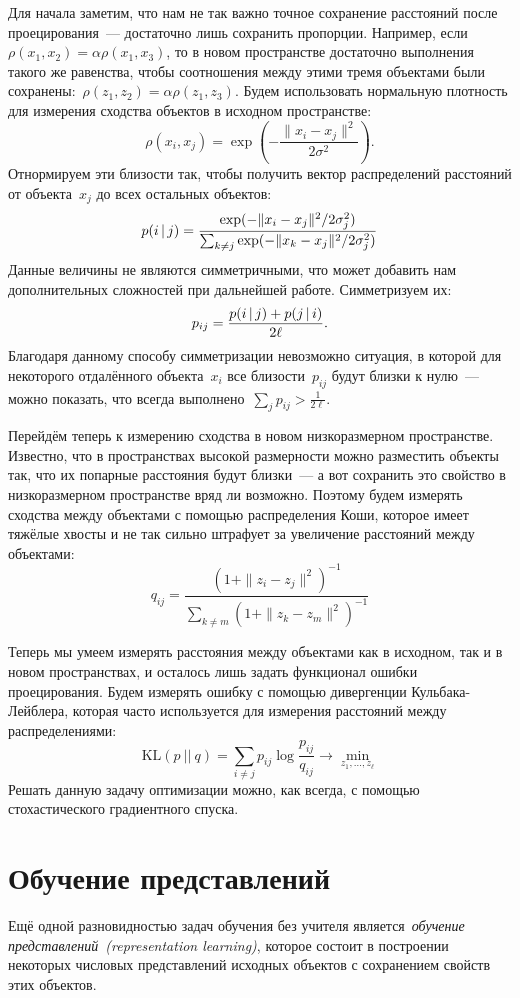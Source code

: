 \documentclass[12pt,fleqn]{article}
\begin{document}
Для начала заметим, что нам не так важно точное сохранение расстояний после проецирования~---
достаточно лишь сохранить пропорции.
Например, если~$\rho(x_1, x_2) = \alpha \rho(x_1, x_3)$,
то в новом пространстве достаточно выполнения такого же равенства,
чтобы соотношения между этими тремя объектами были сохранены:~$\rho(z_1, z_2) = \alpha \rho(z_1, z_3)$.
Будем использовать нормальную плотность для измерения сходства объектов в исходном пространстве:
\[
    \rho(x_i, x_j)
    =
    \exp\left(
        -\frac{
            \|x_i - x_j\|^2
        }{
            2 \sigma^2
        }
    \right).
\]
Отнормируем эти близости так, чтобы получить вектор распределений расстояний от объекта~$x_j$ до всех
остальных объектов:
\[
    p(i \mspace{3mu}{|}\mspace{3mu} j)
    =
    \frac{
        \exp(-\|x_i - x_j\|^2 / 2 \sigma_j^2)
    }{
        \sum_{k \neq j} \exp(-\|x_k - x_j\|^2 / 2 \sigma_j^2)
    }
\]
Данные величины не являются симметричными, что может добавить нам дополнительных сложностей
при дальнейшей работе.
Симметризуем их:
\[
    p_{ij}
    =
    \frac{p(i \mspace{3mu}{|}\mspace{3mu} j) + p(j \mspace{3mu}{|}\mspace{3mu} i)}{2\ell}.
\]
Благодаря данному способу симметризации невозможно ситуация, в которой для некоторого
отдалённого объекта~$x_i$ все близости~$p_{ij}$ будут близки к нулю~---
можно показать, что всегда выполнено~$\sum_j p_{ij} > \frac{1}{2\ell}$.

Перейдём теперь к измерению сходства в новом низкоразмерном пространстве.
Известно, что в пространствах высокой размерности можно разместить объекты так,
что их попарные расстояния будут близки~--- а вот сохранить это свойство в низкоразмерном
пространстве вряд ли возможно.
Поэтому будем измерять сходства между объектами с помощью распределения Коши, которое
имеет тяжёлые хвосты и не так сильно штрафует за увеличение расстояний между объектами:
\[
    q_{ij}
    =
    \frac{
        (1 + \|z_i - z_j\|^2)^{-1}
    }{
        \sum_{k \neq m} (1 + \|z_k - z_m\|^2)^{-1}
    }
\]

Теперь мы умеем измерять расстояния между объектами как в исходном, так и в новом пространствах,
и осталось лишь задать функционал ошибки проецирования.
Будем измерять ошибку с помощью дивергенции Кульбака-Лейблера,
которая часто используется для измерения расстояний между распределениями:
\[
    \text{KL}(p\ ||\ q)
    =
    \sum_{i \neq j}
        p_{ij} \log \frac{p_{ij}}{q_{ij}}
    \to
    \min_{z_1, \dots, z_\ell}
\]
Решать данную задачу оптимизации можно, как всегда, с помощью стохастического градиентного спуска.

\section{Обучение представлений}
Ещё одной разновидностью задач обучения без учителя является~\emph{обучение представлений~(representation learning)},
которое состоит в построении некоторых числовых представлений исходных объектов
с сохранением свойств этих объектов.
\end{document}
